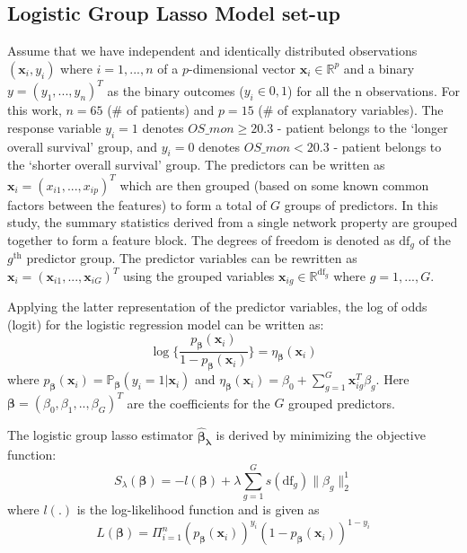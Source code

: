 \subsection{Logistic Group Lasso Model set-up}\label{subsec:grouplasso}
Assume that we have independent and identically distributed observations $(\mathbf{x}_i, y_i)$ where $i=1, . . . , n$ of a $p$-dimensional vector $\mathbf{x}_i \in \mathbb{R}^p$ and a binary 
$y=(y_1,...,y_n)^T$ as the binary outcomes ($y_i \in{0,1}$) for all the n observations. For this work, $n=65$ (\# of patients) and $p=15$ (\# of explanatory variables). The response variable $y_i=1$ denotes $OS\_mon\ge 20.3$ - patient belongs to the \lq longer overall survival' group, and $y_i=0$ denotes $OS\_mon< 20.3$ - patient belongs to the \lq shorter overall survival' group. The predictors can be written as $\mathbf{x}_i = ({x}_{i1}, ...,{x}_{ip})^T$ which are then grouped (based on some known common factors between the features) to form a total of $G$ groups of predictors. In this study, the summary statistics derived from a single network property are grouped together to form a feature block. The degrees of freedom is denoted as $\text{df}_g$ of the $g^{\text{th}}$ predictor group. The predictor variables can be rewritten as $\mathbf{x}_i=(\mathbf{x}_{i1}, ..., \mathbf{x}_{iG})^T$ using the grouped variables $\mathbf{x}_{ig}\in\mathbb{R}^{\text{df}_g}$ where $g=1, ..., G$.\par
Applying the latter representation of the predictor variables, the log of odds (logit) for the logistic regression model can be written as:
\begin{equation}\label{eq:1}
\log\{\frac{p_{\pmb{\beta}}(\mathbf{x}_i)}{1-p_{\pmb{\beta}}(\mathbf{x}_i)}\}=\eta_{\pmb{\beta}}(\mathbf{x}_i)
\end{equation}
where $p_{\pmb{\beta}}(\mathbf{x}_i) = \mathbb{P}_{\pmb{\beta}}(y_i=1|\mathbf{x}_i)$ and $\eta_{\pmb{\beta}}(\mathbf{x}_i) = \beta_0+\sum_{g=1}^{G}\mathbf{x}_{ig}^T\beta_g$. Here $\pmb{\beta}=(\beta_0,\beta_1, .., \beta_G)^T$ are the coefficients for the $G$ grouped predictors.\par
The logistic group lasso estimator $\pmb{\hat\beta_{\lambda}}$ is derived by minimizing the objective function:
\begin{equation}\label{eq:2}
S_{\lambda}(\pmb{\beta}) = -l(\pmb{\beta})+\lambda\sum_{g=1}^{G} s(\text{df}_g)\|\beta_g\|_2^1
\end{equation}
where $l(.)$ is the log-likelihood function and is given as
\begin{equation*}
L(\pmb{\beta})= \Pi_{i=1}^{n}(p_{\pmb{\beta}}(\mathbf{x}_i))^{y_i}(1-p_{\pmb{\beta}}(\mathbf{x}_i))^{1-y_i}
\end{equation*}

